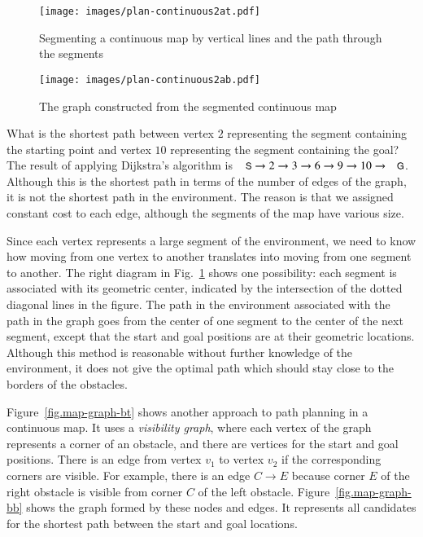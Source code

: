 \begin{figure}
\begin{center}
\texttt{[image: images/plan-continuous2at.pdf]}
\end{center}
\caption{Segmenting a continuous map by vertical lines and the path through the segments}\label{fig.map-graph-at}
\end{figure}

\begin{figure}
\begin{center}
\texttt{[image: images/plan-continuous2ab.pdf]}
\end{center}
\caption{The graph constructed from the segmented continuous map}\label{fig.map-graph-ab}
\end{figure}

What is the shortest path between vertex $2$ representing the segment containing the starting point and vertex $10$ representing the segment containing the goal? The result of applying Dijkstra's algorithm is $\p{S} \rightarrow 2\rightarrow 3\rightarrow 6\rightarrow 9\rightarrow 10 \rightarrow \p{G}$. Although this is the shortest path in terms of the number of edges of the graph, it is not the shortest path in the environment. The reason is that we assigned constant cost to each edge, although the segments of the map have various size. 

Since each vertex represents a large segment of the environment, we need to know how moving from one vertex to another translates into moving from one segment to another. The right diagram in Fig.~\ref{fig.map-graph-at} shows one possibility: each segment is associated with its geometric center, indicated by the intersection of the dotted diagonal lines in the figure. The path in the environment associated with the path in the graph goes from the center of one segment to the center of the next segment, except that the start and goal positions are at their geometric locations. Although this method is reasonable without further knowledge of the environment, it does not give the optimal path which should stay close to the borders of the obstacles.

Figure~\ref{fig.map-graph-bt} shows another approach to path planning in a continuous map. It uses a \emph{visibility graph}, where each vertex of the graph represents a corner of an obstacle, and there are vertices for the start and goal positions. There is an edge from vertex $v_1$ to vertex $v_2$ if the corresponding corners are visible. For example, there is an edge $C\rightarrow E$ because corner $E$ of the right obstacle is visible from corner $C$ of the left obstacle. Figure~\ref{fig.map-graph-bb} shows the graph formed by these nodes and edges. It represents all candidates for the shortest path between the start and goal locations.

